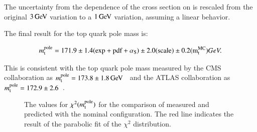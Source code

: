 The uncertainty from the dependence of the cross section on \mtMC is rescaled from the original $3 \,\text{Ge\hspace{-.08em}V}$ variation to a $1 \,\text{Ge\hspace{-.08em}V}$ variation, assuming a linear behavior.

The final result for the top quark pole mass is:

\begin{equation}
m_\mathrm{t}^{\mathrm{pole}} = 171.9 \pm 1.4 \mathrm{(exp+pdf+\alpha_\mathrm{S})} \pm 2.0 \mathrm{(scale)} \pm 0.2 \mathrm{(m_\mathrm{t}^{\mathrm{MC}})} GeV . 
\end{equation}

This is consistent with the top quark pole mass measured by the CMS collaboration as $m_\mathrm{t}^{\mathrm{pole}} = 173.8 \pm 1.8 \,\text{Ge\hspace{-.08em}V}$~\cite{Khachatryan:2016mqs} and the ATLAS collaboration as $m_\mathrm{t}^{\mathrm{pole}}=172.9 \pm 2.6$~\cite{Aad:2014kva}.

\begin{figure}[htbp!]
  \begin{center}

\caption{The values for $\chi^2(m_\mathrm{t}^{\mathrm{pole}})$ for the comparison of measured and predicted \sttbar with the nominal configuration. The red line indicates the result of the parabolic fit of the $\chi^2$ distribution. 
       \label{fig:res_polemass}}
  \end{center}
\end{figure}

